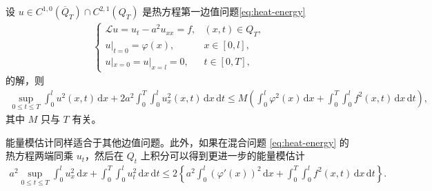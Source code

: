 \documentclass[../../main.tex]{subfiles}%
\begin{document}
\begin{theorem}
设 $u\in C^{1,0}(\overline{Q}_T)\cap C^{2,1}(Q_T)$ 是热方程第一边值问题\eqref{eq:heat-energy}
\begin{align}
\begin{cases}
\mathcal{L}u=u_t-a^2u_{xx}=f, & (x,t)\in Q_T,\\
u|_{t=0}=\varphi(x), & x\in[0,l],\\
u|_{x=0}=u|_{x=l}=0, & t\in[0,T],
\end{cases} \label{eq:heat-energy}
\end{align}
的解，则
\begin{align}
\sup_{0\leqslant t\leqslant T}\int_0^l u^2(x,t)\,\mathrm{d}x+2a^2\int_0^T\int_0^l u_x^2(x,t)\,\mathrm{d}x\,\mathrm{d}t
\leqslant M\left(\int_0^l\varphi^2(x)\,\mathrm{d}x+\int_0^T\int_0^l f^2(x,t)\,\mathrm{d}x\,\mathrm{d}t\right), \label{eq:heat-energy-est}
\end{align}
其中 $M$ 只与 $T$ 有关。
\end{theorem}
\begin{remark}
能量模估计同样适合于其他边值问题。此外，如果在混合问题 \eqref{eq:heat-energy} 的热方程两端同乘 $u_t$，然后在 $Q_t$ 上积分可以得到更进一步的能量模估计
\begin{align*}
a^2\sup_{0\leqslant t\leqslant T}\int_0^l u_x^2\,\mathrm{d}x+\int_0^T\int_0^l u_t^2\,\mathrm{d}x\,\mathrm{d}t
\leqslant 2\left\{a^2\int_0^l(\varphi'(x))^2\,\mathrm{d}x+\int_0^T\int_0^l f^2(x,t)\,\mathrm{d}x\,\mathrm{d}t\right\}.
\end{align*}
\end{remark}
\end{document}
